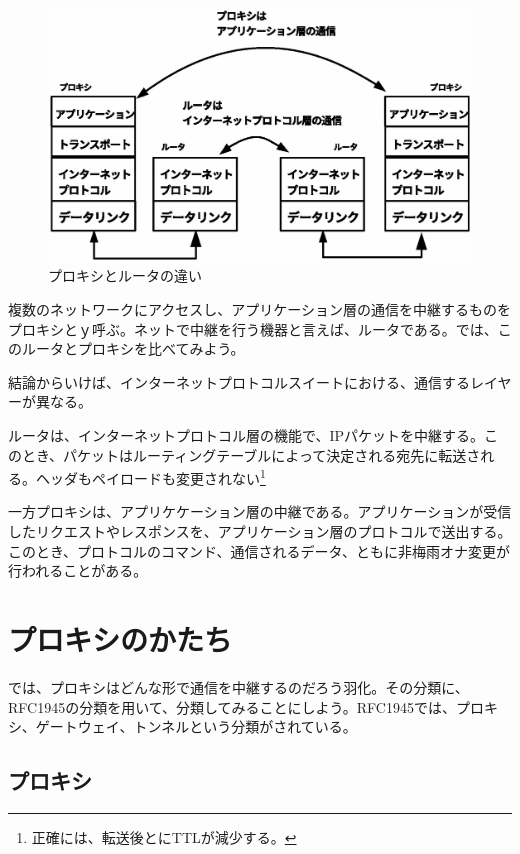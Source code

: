 \begin{figure}[htbp]
	\includegraphics[width=12cm,clip]{draw/fig2.eps}
	\caption{プロキシとルータの違い}
	\label{fig:proxy and router}
\end{figure}

複数のネットワークにアクセスし、アプリケーション層の通信を中継するものをプロキシとｙ呼ぶ。ネットで中継を行う機器と言えば、ルータである。では、このルータとプロキシを比べてみよう。

結論からいけば、インターネットプロトコルスイートにおける、通信するレイヤーが異なる。

ルータは、インターネットプロトコル層の機能で、IPパケットを中継する。このとき、パケットはルーティングテーブルによって決定される宛先に転送される。ヘッダもペイロードも変更されない\footnote{正確には、転送後とにTTLが減少する。}

一方プロキシは、アプリケケーション層の中継である。アプリケーションが受信したリクエストやレスポンスを、アプリケーション層のプロトコルで送出する。このとき、プロトコルのコマンド、通信されるデータ、ともに非梅雨オナ変更が行われることがある。

\section{プロキシのかたち}
では、プロキシはどんな形で通信を中継するのだろう羽化。その分類に、RFC1945の分類を用いて、分類してみることにしよう。RFC1945では、プロキシ、ゲートウェイ、トンネルという分類がされている。

\subsection{プロキシ}

